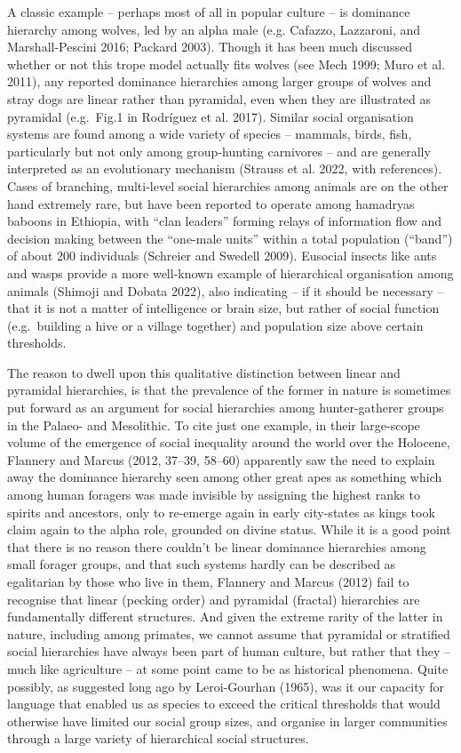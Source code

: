 \documentclass[
  12pt,
  a4paper, twoside]{book}
\begin{document}
A classic example -- perhaps most of all in popular culture -- is dominance hierarchy among wolves, led by an alpha male (e.g. Cafazzo, Lazzaroni, and Marshall-Pescini 2016; Packard 2003). Though it has been much discussed whether or not this trope model actually fits wolves (see Mech 1999; Muro et al. 2011), any reported dominance hierarchies among larger groups of wolves and stray dogs are linear rather than pyramidal, even when they are illustrated as pyramidal (e.g.~Fig.1 in Rodríguez et al. 2017). Similar social organisation systems are found among a wide variety of species -- mammals, birds, fish, particularly but not only among group-hunting carnivores -- and are generally interpreted as an evolutionary mechanism (Strauss et al. 2022, with references). Cases of branching, multi-level social hierarchies among animals are on the other hand extremely rare, but have been reported to operate among hamadryas baboons in Ethiopia, with ``clan leaders'' forming relays of information flow and decision making between the ``one-male units'' within a total population (``band'') of about 200 individuals (Schreier and Swedell 2009). Eusocial insects like ants and wasps provide a more well-known example of hierarchical organisation among animals (Shimoji and Dobata 2022), also indicating -- if it should be necessary -- that it is not a matter of intelligence or brain size, but rather of social function (e.g.~building a hive or a village together) and population size above certain thresholds.

The reason to dwell upon this qualitative distinction between linear and pyramidal hierarchies, is that the prevalence of the former in nature is sometimes put forward as an argument for social hierarchies among hunter-gatherer groups in the Palaeo- and Mesolithic. To cite just one example, in their large-scope volume of the emergence of social inequality around the world over the Holocene, Flannery and Marcus (2012, 37--39, 58--60) apparently saw the need to explain away the dominance hierarchy seen among other great apes as something which among human foragers was made invisible by assigning the highest ranks to spirits and ancestors, only to re-emerge again in early city-states as kings took claim again to the alpha role, grounded on divine status. While it is a good point that there is no reason there couldn't be linear dominance hierarchies among small forager groups, and that such systems hardly can be described as egalitarian by those who live in them, Flannery and Marcus (2012) fail to recognise that linear (pecking order) and pyramidal (fractal) hierarchies are fundamentally different structures. And given the extreme rarity of the latter in nature, including among primates, we cannot assume that pyramidal or stratified social hierarchies have always been part of human culture, but rather that they -- much like agriculture -- at some point came to be as historical phenomena. Quite possibly, as suggested long ago by Leroi-Gourhan (1965), was it our capacity for language that enabled us as species to exceed the critical thresholds that would otherwise have limited our social group sizes, and organise in larger communities through a large variety of hierarchical social structures.
\end{document}

